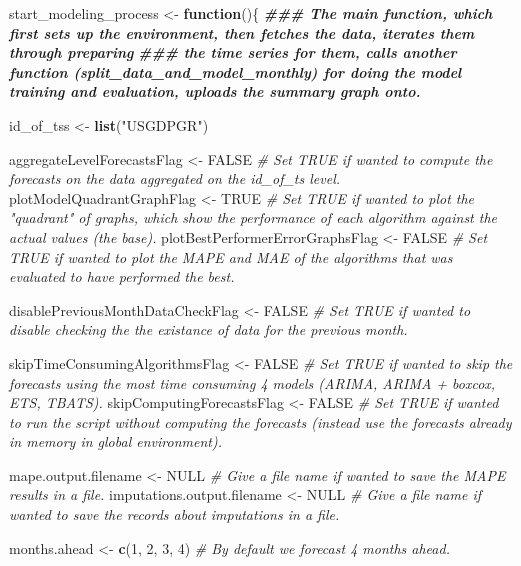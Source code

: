 \documentclass[
]{article}
\newenvironment{Shaded}{\begin{snugshade}}{\end{snugshade}}
\newcommand{\CommentTok}[1]{\textcolor[rgb]{0.56,0.35,0.01}{\textit{#1}}}
\newcommand{\ConstantTok}[1]{\textcolor[rgb]{0.56,0.35,0.01}{#1}}
\newcommand{\ControlFlowTok}[1]{\textcolor[rgb]{0.13,0.29,0.53}{\textbf{#1}}}
\newcommand{\DecValTok}[1]{\textcolor[rgb]{0.00,0.00,0.81}{#1}}
\newcommand{\DocumentationTok}[1]{\textcolor[rgb]{0.56,0.35,0.01}{\textbf{\textit{#1}}}}
\newcommand{\FunctionTok}[1]{\textcolor[rgb]{0.13,0.29,0.53}{\textbf{#1}}}
\newcommand{\NormalTok}[1]{#1}
\newcommand{\OtherTok}[1]{\textcolor[rgb]{0.56,0.35,0.01}{#1}}
\newcommand{\StringTok}[1]{\textcolor[rgb]{0.31,0.60,0.02}{#1}}
\begin{document}
\begin{Shaded}
\begin{Highlighting}[]
\NormalTok{start\_modeling\_process }\OtherTok{\textless{}{-}} \ControlFlowTok{function}\NormalTok{()\{}
\DocumentationTok{\#\#\# The main function, which first sets up the environment, then fetches the data, iterates them through preparing}
\DocumentationTok{\#\#\# the time series for them, calls another function (split\_data\_and\_model\_monthly) for doing the model training and evaluation, uploads the summary graph onto.}

\NormalTok{  id\_of\_tss }\OtherTok{\textless{}{-}} \FunctionTok{list}\NormalTok{(}\StringTok{"USGDPGR"}\NormalTok{)}
  
\NormalTok{  aggregateLevelForecastsFlag }\OtherTok{\textless{}{-}} \ConstantTok{FALSE} \CommentTok{\# Set TRUE if wanted to compute the forecasts on the data aggregated on the id\_of\_ts level.}
\NormalTok{  plotModelQuadrantGraphFlag }\OtherTok{\textless{}{-}} \ConstantTok{TRUE} \CommentTok{\# Set TRUE if wanted to plot the "quadrant" of graphs, which show the performance of each algorithm against the actual values (the base).}
\NormalTok{  plotBestPerformerErrorGraphsFlag }\OtherTok{\textless{}{-}} \ConstantTok{FALSE} \CommentTok{\# Set TRUE if wanted to plot the MAPE and MAE of the algorithms that was evaluated to have performed the best.}
  
\NormalTok{  disablePreviousMonthDataCheckFlag }\OtherTok{\textless{}{-}} \ConstantTok{FALSE} \CommentTok{\# Set TRUE if wanted to disable checking the the existance of data for the previous month.}
  
\NormalTok{  skipTimeConsumingAlgorithmsFlag }\OtherTok{\textless{}{-}} \ConstantTok{FALSE} \CommentTok{\# Set TRUE if wanted to skip the forecasts using the most time consuming 4 models (ARIMA, ARIMA + boxcox, ETS, TBATS).}
\NormalTok{  skipComputingForecastsFlag }\OtherTok{\textless{}{-}} \ConstantTok{FALSE} \CommentTok{\# Set TRUE if wanted to run the script without computing the forecasts (instead use the forecasts already in memory in global environment).}
    
\NormalTok{  mape.output.filename }\OtherTok{\textless{}{-}} \ConstantTok{NULL} \CommentTok{\# Give a file name if wanted to save the MAPE results in a file.}
\NormalTok{  imputations.output.filename }\OtherTok{\textless{}{-}} \ConstantTok{NULL} \CommentTok{\# Give a file name if wanted to save the records about imputations in a file.}
  
\NormalTok{  months.ahead }\OtherTok{\textless{}{-}} \FunctionTok{c}\NormalTok{(}\DecValTok{1}\NormalTok{, }\DecValTok{2}\NormalTok{, }\DecValTok{3}\NormalTok{, }\DecValTok{4}\NormalTok{) }\CommentTok{\# By default we forecast 4 months ahead.}
  

\end{Highlighting}
\end{Shaded}
\end{document}
